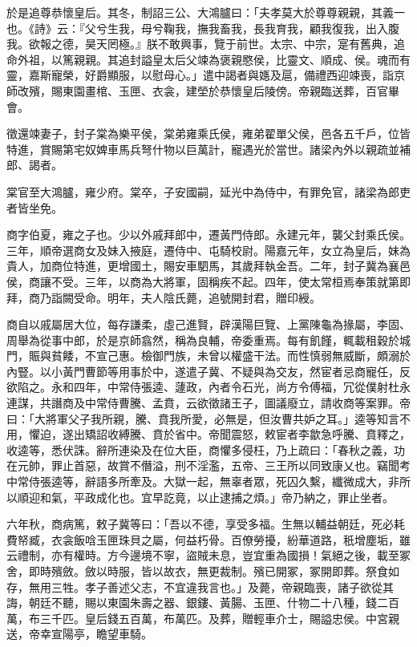 \begin{pinyinscope}
於是追尊恭懷皇后。其冬，制詔三公、大鴻臚曰：「夫孝莫大於尊尊親親，其義一也。《詩》云：『父兮生我，母兮鞠我，撫我畜我，長我育我，顧我復我，出入腹我。欲報之德，昊天罔極。』朕不敢興事，覽于前世。太宗、中宗，寔有舊典，追命外祖，以篤親親。其追封謚皇太后父竦為褒親愍侯，比靈文、順成、侯。魂而有靈，嘉斯寵榮，好爵顯服，以慰母心。」遣中謁者與嫕及扈，備禮西迎竦喪，詣京師改殯，賜東園畫棺、玉匣、衣衾，建塋於恭懷皇后陵傍。帝親臨送葬，百官畢會。

徵還竦妻子，封子棠為樂平侯，棠弟雍乘氏侯，雍弟翟單父侯，邑各五千戶，位皆特進，賞賜第宅奴婢車馬兵弩什物以巨萬計，寵遇光於當世。諸梁內外以親疏並補郎、謁者。

棠官至大鴻臚，雍少府。棠卒，子安國嗣，延光中為侍中，有罪免官，諸梁為郎吏者皆坐免。

商字伯夏，雍之子也。少以外戚拜郎中，遷黃門侍郎。永建元年，襲父封乘氏侯。三年，順帝選商女及妹入掖庭，遷侍中、屯騎校尉。陽嘉元年，女立為皇后，妹為貴人，加商位特進，更增國土，賜安車駟馬，其歲拜執金吾。二年，封子冀為襄邑侯，商讓不受。三年，以商為大將軍，固稱疾不起。四年，使太常桓焉奉策就第即拜，商乃詣闕受命。明年，夫人陰氏薨，追號開封君，贈印綬。

商自以戚屬居大位，每存謙柔，虛己進賢，辟漢陽巨覽、上黨陳龜為掾屬，李固、周舉為從事中郎，於是京師翕然，稱為良輔，帝委重焉。每有飢饉，輒載租穀於城門，賑與貧餧，不宣己惠。檢御門族，未曾以權盛干法。而性慎弱無威斷，頗溺於內豎。以小黃門曹節等用事於中，遂遣子冀、不疑與為交友，然宦者忌商寵任，反欲陷之。永和四年，中常侍張逵、蘧政，內者令石光，尚方令傅福，冗從僕射杜永連謀，共譖商及中常侍曹騰、孟賁，云欲徵諸王子，圖議廢立，請收商等案罪。帝曰：「大將軍父子我所親，騰、賁我所愛，必無是，但汝曹共妒之耳。」逵等知言不用，懼迫，遂出矯詔收縛騰、賁於省中。帝聞震怒，敕宦者李歙急呼騰、賁釋之，收逵等，悉伏誅。辭所連染及在位大臣，商懼多侵枉，乃上疏曰：「春秋之義，功在元帥，罪止首惡，故賞不僭溢，刑不淫濫，五帝、三王所以同致康乂也。竊聞考中常侍張逵等，辭語多所牽及。大獄一起，無辜者眾，死囚久繫，纖微成大，非所以順迎和氣，平政成化也。宜早訖竟，以止逮捕之煩。」帝乃納之，罪止坐者。

六年秋，商病篤，敕子冀等曰：「吾以不德，享受多福。生無以輔益朝廷，死必耗費帑臧，衣衾飯唅玉匣珠貝之屬，何益朽骨。百僚勞擾，紛華道路，秖增塵垢，雖云禮制，亦有權時。方今邊境不寧，盜賊未息，豈宜重為國損！氣絕之後，載至冢舍，即時殯斂。斂以時服，皆以故衣，無更裁制。殯已開冢，冢開即葬。祭食如存，無用三牲。孝子善述父志，不宜違我言也。」及薨，帝親臨喪，諸子欲從其誨，朝廷不聽，賜以東園朱壽之器、銀鏤、黃腸、玉匣、什物二十八種，錢二百萬，布三千匹。皇后錢五百萬，布萬匹。及葬，贈輕車介士，賜謚忠侯。中宮親送，帝幸宣陽亭，瞻望車騎。


\end{pinyinscope}
